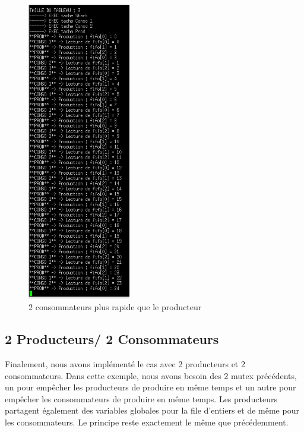 \documentclass[a4paper,12pt]{report}
\begin{document}
\begin{figure}[h]
	\centering
		\includegraphics[width=0.4\textwidth]{screens/conso_plus_rapide_sem_2conso_meme_vitesse_1prod.png}
		\caption{2 consommateurs plus rapide que le producteur}
		\label{conso_plus_rapide_sem_2conso_meme_vitesse_1prod}
\end{figure}

\newpage

\subsection{2 Producteurs/ 2 Consommateurs}

Finalement, nous avons implémenté le cas avec 2 producteurs et 2 consommateurs. Dans cette exemple, nous avons besoin des 2 mutex précédents, un pour empêcher les producteurs de produire en même temps et un autre pour empêcher les consommateurs de produire en même temps. Les producteurs partagent également des variables globales pour la file d'entiers et de même pour les consommateurs. Le principe reste exactement le même que précédemment.\newline
\end{document}
